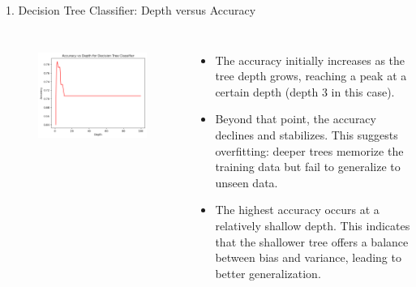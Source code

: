 \documentclass[aspectratio=169,xcolor=dvipsnames]{beamer}
\begin{document}
\begin{frame}{1. Decision Tree Classifier: Depth versus Accuracy}

    \begin{columns}[c] %

        \begin{figure}
            \centering
            \includegraphics[width=1.15\linewidth]{out/plot7_DT_accuracy_vs_depth.png}
            \label{fig:1}
        \end{figure}
        

        \begin{itemize}
        \item The accuracy initially increases as the tree depth grows, reaching a peak at a certain depth 
        (depth 3 in this case).
        
        \item Beyond that point, the accuracy declines and stabilizes. This suggests overfitting: deeper 
        trees memorize the training data but fail to generalize to unseen data.
        
        \item The highest accuracy occurs at a relatively shallow depth. This indicates that the 
        shallower tree offers a balance between bias and variance, leading to better generalization.
        
        \end{itemize}


    \end{columns}

\end{frame}
\end{document}
